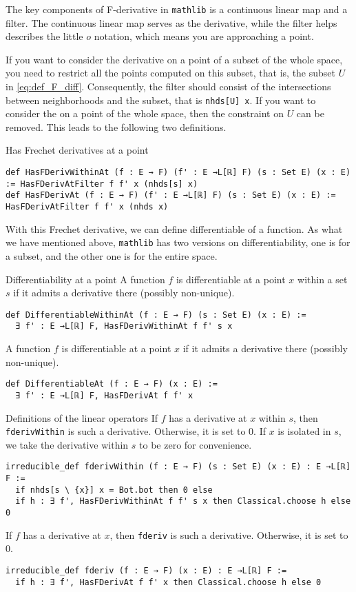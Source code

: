 \documentclass[a4paper]{article}
\begin{document}
The key components of F-derivative in \texttt{mathlib} is a continuous linear map and a filter. The continuous linear map serves as the derivative, while the filter helps describes the little $o$ notation, which means you are approaching a point.

If you want to consider the derivative on a point of a subset of the whole space, you need to restrict all the points computed on this subset, that is, the subset $U$ in \eqref{eq:def_F_diff}. Consequently, the filter should consist of the intersections between neighborhoods and the subset, that is \texttt{nhds[U] x}. If you want to consider the on a point of the whole space, then the constraint on $U$ can be removed. This leads to the following two definitions.
\begin{dfn}{Has Frechet derivatives at a point}
\begin{lstlisting}[style = lean]
def HasFDerivWithinAt (f : E → F) (f' : E →L[ℝ] F) (s : Set E) (x : E) := HasFDerivAtFilter f f' x (nhds[s] x)
def HasFDerivAt (f : E → F) (f' : E →L[ℝ] F) (s : Set E) (x : E) := HasFDerivAtFilter f f' x (nhds x)
\end{lstlisting}
\end{dfn}
With this Frechet derivative, we can define differentiable of a function. As what we have mentioned above, \texttt{mathlib} has two versions on differentiability, one is for a subset, and the other one is for the entire space.
\begin{dfn}{Differentiability at a point}
A function $f$ is differentiable at a point $x$ within a set $s$ if it admits a derivative there (possibly non-unique).
\begin{lstlisting}[style=lean]
def DifferentiableWithinAt (f : E → F) (s : Set E) (x : E) :=
  ∃ f' : E →L[ℝ] F, HasFDerivWithinAt f f' s x
\end{lstlisting}
A function $f$ is differentiable at a point $x$ if it admits a derivative there (possibly non-unique).
\begin{lstlisting}[style = lean]
def DifferentiableAt (f : E → F) (x : E) :=
  ∃ f' : E →L[ℝ] F, HasFDerivAt f f' x
\end{lstlisting}
\end{dfn}

\begin{dfn}{Definitions of the linear operators}
If $f$ has a derivative at $x$ within $s$, then \texttt{fderivWithin} is such a derivative. Otherwise, it is set to $0$. If $x$ is isolated in $s$, we take the derivative within $s$ to be zero for convenience.
\begin{lstlisting}[style = lean]
irreducible_def fderivWithin (f : E → F) (s : Set E) (x : E) : E →L[ℝ] F :=
  if nhds[s \ {x}] x = Bot.bot then 0 else
  if h : ∃ f', HasFDerivWithinAt f f' s x then Classical.choose h else 0
\end{lstlisting}
If $f$ has a derivative at $x$, then \texttt{fderiv} is such a derivative. Otherwise, it is set to $0$.
\begin{lstlisting}[style = lean]
irreducible_def fderiv (f : E → F) (x : E) : E →L[ℝ] F :=
  if h : ∃ f', HasFDerivAt f f' x then Classical.choose h else 0
\end{lstlisting}
\end{dfn}
\end{document}
